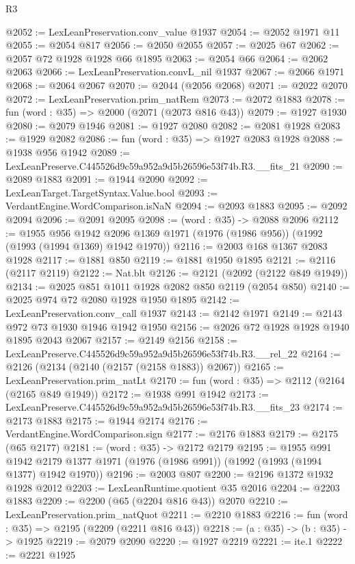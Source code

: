 \begin{lexlean}{R3}
\begin{coremodule}
@2052 := LexLeanPreservation.conv_value @1937
@2054 := @2052 @1971 @11
@2055 := @2054 @817
@2056 := @2050 @2055
@2057 := @2025 @67
@2062 := @2057 @72 @1928 @1928 @66 @1895
@2063 := @2054 @66
@2064 := @2062 @2063
@2066 := LexLeanPreservation.convL_nil @1937
@2067 := @2066 @1971
@2068 := @2064 @2067
@2070 := @2044 (@2056 @2068)
@2071 := @2022 @2070
@2072 := LexLeanPreservation.prim_natRem
@2073 := @2072 @1883
@2078 := fun (word : @35) => @2000 (@2071 (@2073 @816 @43))
@2079 := @1927 @1930
@2080 := @2079 @1946
@2081 := @1927 @2080
@2082 := @2081 @1928
@2083 := @1929 @2082
@2086 := fun (word : @35) => @1927 @2083 @1928
@2088 := @1938 @956 @1942
@2089 := LexLeanPreserve.C445526d9c59a952a9d5b26596e53f74b.R3.__fits_21
@2090 := @2089 @1883
@2091 := @1944 @2090
@2092 := LexLeanTarget.TargetSyntax.Value.bool
@2093 := VerdantEngine.WordComparison.isNaN
@2094 := @2093 @1883
@2095 := @2092 @2094
@2096 := @2091 @2095
@2098 := (word : @35) -> @2088 @2096
@2112 := @1955
    @956
    @1942
    @2096
    @1369
    @1971
    (@1976 (@1986 @956))
    (@1992 (@1993 (@1994 @1369) @1942 @1970))
@2116 := @2003 @168 @1367 @2083 @1928
@2117 := @1881 @850
@2119 := @1881 @1950 @1895
@2121 := @2116 (@2117 @2119)
@2122 := Nat.blt
@2126 := @2121 (@2092 (@2122 @849 @1949))
@2134 := @2025 @851 @1011 @1928 @2082 @850 @2119 (@2054 @850)
@2140 := @2025 @974 @72 @2080 @1928 @1950 @1895
@2142 := LexLeanPreservation.conv_call @1937
@2143 := @2142 @1971
@2149 := @2143 @972 @73 @1930 @1946 @1942 @1950
@2156 := @2026 @72 @1928 @1928 @1940 @1895 @2043 @2067
@2157 := @2149 @2156
@2158 := LexLeanPreserve.C445526d9c59a952a9d5b26596e53f74b.R3.__rel_22
@2164 := @2126 (@2134 (@2140 (@2157 (@2158 @1883)) @2067))
@2165 := LexLeanPreservation.prim_natLt
@2170 := fun (word : @35) => @2112 (@2164 (@2165 @849 @1949))
@2172 := @1938 @991 @1942
@2173 := LexLeanPreserve.C445526d9c59a952a9d5b26596e53f74b.R3.__fits_23
@2174 := @2173 @1883
@2175 := @1944 @2174
@2176 := VerdantEngine.WordComparison.sign
@2177 := @2176 @1883
@2179 := @2175 (@65 @2177)
@2181 := (word : @35) -> @2172 @2179
@2195 := @1955
    @991
    @1942
    @2179
    @1377
    @1971
    (@1976 (@1986 @991))
    (@1992 (@1993 (@1994 @1377) @1942 @1970))
@2196 := @2003 @807
@2200 := @2196 @1372 @1932 @1928 @2012
@2203 := LexLeanRuntime.quotient @35 @2016
@2204 := @2203 @1883
@2209 := @2200 (@65 (@2204 @816 @43)) @2070
@2210 := LexLeanPreservation.prim_natQuot
@2211 := @2210 @1883
@2216 := fun (word : @35) => @2195 (@2209 (@2211 @816 @43))
@2218 := (a : @35) -> (b : @35) -> @1925
@2219 := @2079 @2090
@2220 := @1927 @2219
@2221 := ite.{1}
@2222 := @2221 @1925

\end{coremodule}
\end{lexlean}
